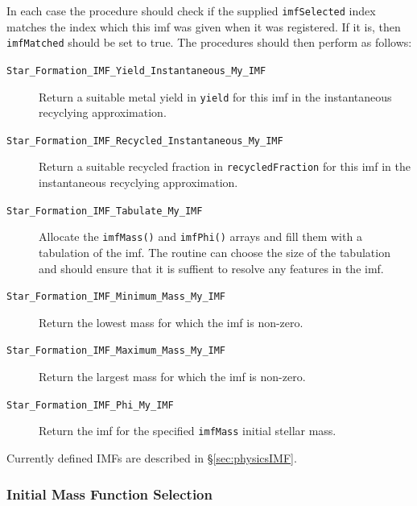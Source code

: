 In each case the procedure should check if the supplied {\tt imfSelected} index matches the index which this \gls{imf} was given when it was registered. If it is, then {\tt imfMatched} should be set to true. The procedures should then perform as follows:
\begin{description}
 \item [{\tt Star\_Formation\_IMF\_Yield\_Instantaneous\_My\_IMF}] Return a suitable metal yield in {\tt yield} for this \gls{imf} in the instantaneous recyclying approximation.
 \item [{\tt Star\_Formation\_IMF\_Recycled\_Instantaneous\_My\_IMF}] Return a suitable recycled fraction in {\tt recycledFraction} for this \gls{imf} in the instantaneous recyclying approximation.
 \item [{\tt Star\_Formation\_IMF\_Tabulate\_My\_IMF}] Allocate the {\tt imfMass()} and {\tt imfPhi()} arrays and fill them with a tabulation of the \gls{imf}. The routine can choose the size of the tabulation and should ensure that it is suffient to resolve any features in the \gls{imf}.
 \item [{\tt Star\_Formation\_IMF\_Minimum\_Mass\_My\_IMF}] Return the lowest mass for which the \gls{imf} is non-zero.
 \item [{\tt Star\_Formation\_IMF\_Maximum\_Mass\_My\_IMF}] Return the largest mass for which the \gls{imf} is non-zero.
 \item [{\tt Star\_Formation\_IMF\_Phi\_My\_IMF}] Return the \gls{imf} for the specified {\tt imfMass} initial stellar mass.
\end{description}
Currently defined IMFs are described in \S\ref{sec:physicsIMF}.

\subsubsection{Initial Mass Function Selection}

